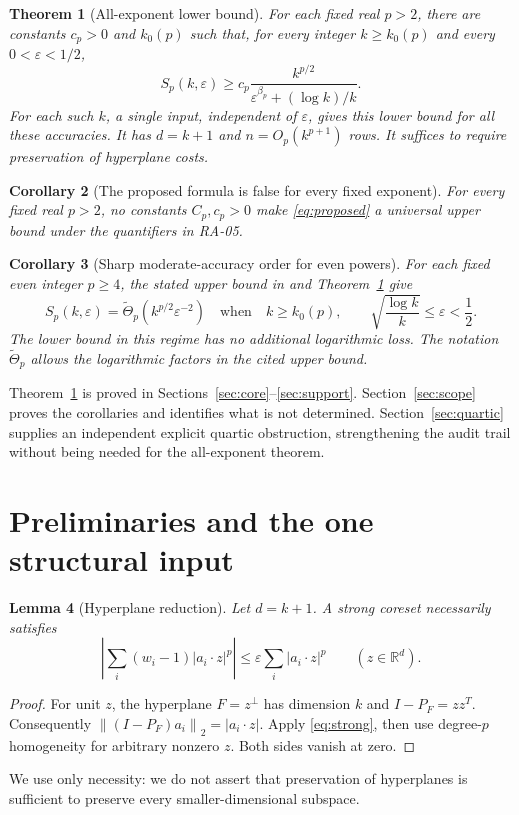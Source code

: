 \documentclass[11pt,letterpaper]{article}
\newtheorem{theorem}{Theorem}[section]
\newtheorem{lemma}[theorem]{Lemma}
\newtheorem{corollary}[theorem]{Corollary}
\theoremstyle{definition}
\theoremstyle{remark}
\numberwithin{equation}{section}
\newcommand{\R}{\mathbb R}
\newcommand{\eps}{\varepsilon}
\newcommand{\norm}[1]{\left\lVert#1\right\rVert}
\newcommand{\abs}[1]{\left|#1\right|}
\newcommand{\littleTheta}{\widetilde\Theta}
\begin{document}
\begin{theorem}[All-exponent lower bound]\label{thm:main}
For each fixed real $p>2$, there are constants $c_p>0$ and $k_0(p)$ such that, for every integer $k\ge k_0(p)$ and every $0<\eps<1/2$,
\begin{equation}\label{eq:main}
 S_p(k,\eps)\ge c_p\frac{k^{p/2}}{\eps^{\beta_p}+(\log k)/k}.
\end{equation}
For each such $k$, a single input, independent of $\eps$, gives this lower bound for all these accuracies. It has $d=k+1$ and $n=O_p(k^{p+1})$ rows. It suffices to require preservation of hyperplane costs.
\end{theorem}

\begin{corollary}[The proposed formula is false for every fixed exponent]\label{cor:false}
For every fixed real $p>2$, no constants $C_p,c_p>0$ make \eqref{eq:proposed} a universal upper bound under the quantifiers in RA-05.
\end{corollary}

\begin{corollary}[Sharp moderate-accuracy order for even powers]\label{cor:even}
For each fixed even integer $p\ge4$, the stated upper bound in \cite{LMW} and Theorem~\ref{thm:main} give
\begin{equation}\label{eq:evenmatch}
 S_p(k,\eps)=\littleTheta_p(k^{p/2}\eps^{-2})
 \quad\text{when}\quad
 k\ge k_0(p),\qquad \sqrt{\frac{\log k}{k}}\le\eps<\frac12.
\end{equation}
The lower bound in this regime has no additional logarithmic loss. The notation $\littleTheta_p$ allows the logarithmic factors in the cited upper bound.
\end{corollary}

Theorem~\ref{thm:main} is proved in Sections~\ref{sec:core}--\ref{sec:support}. Section~\ref{sec:scope} proves the corollaries and identifies what is not determined. Section~\ref{sec:quartic} supplies an independent explicit quartic obstruction, strengthening the audit trail without being needed for the all-exponent theorem.

\section{Preliminaries and the one structural input}\label{sec:prelim}
\begin{lemma}[Hyperplane reduction]\label{lem:hyperplane}
Let $d=k+1$. A strong coreset necessarily satisfies
\begin{equation}\label{eq:hyperplane}
 \abs{\sum_i(w_i-1)\abs{a_i\cdot z}^p}
 \le\eps\sum_i\abs{a_i\cdot z}^p
 \qquad(z\in\R^d).
\end{equation}
\end{lemma}
\begin{proof}
For unit $z$, the hyperplane $F=z^\perp$ has dimension $k$ and $I-P_F=zz^T$. Consequently $\norm{(I-P_F)a_i}_2=|a_i\cdot z|$. Apply \eqref{eq:strong}, then use degree-$p$ homogeneity for arbitrary nonzero $z$. Both sides vanish at zero.
\end{proof}
We use only necessity: we do not assert that preservation of hyperplanes is sufficient to preserve every smaller-dimensional subspace.
\end{document}
